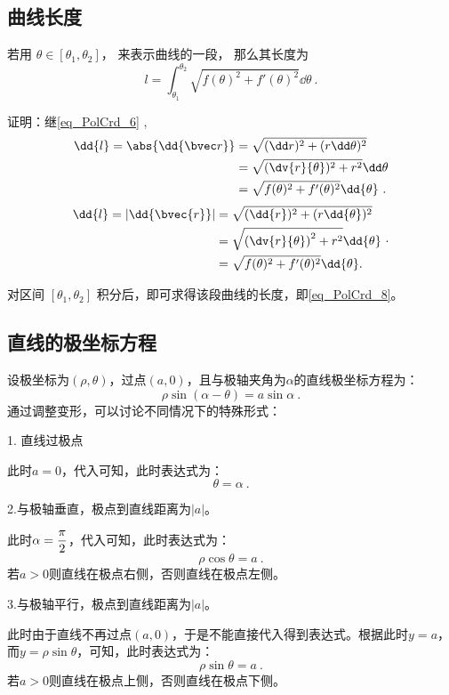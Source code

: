 \subsection{曲线长度}

若用 $\theta \in [\theta_1, \theta_2]$， 来表示曲线的一段， 那么其长度为
\begin{equation}\label{eq_PolCrd_8}
l = \int_{\theta_1}^{\theta_2} \sqrt{f(\theta)^2 + f'(\theta)^2} \dd{\theta}~.
\end{equation}

证明：继\autoref{eq_PolCrd_6} ,
\begin{align}
\dd{l} = \abs{\dd{\bvec r}} &=\sqrt{(\dd r)^2 + (r \dd \theta)^2} \\
&=\sqrt{(\dv {r}{\theta} )^2 + r^2} \dd \theta \\
&=\sqrt{f(\theta)^2 + f'(\theta)^2} \dd{\theta}~.
\end{align}
\begin{equation}
\begin{split}
\dd{l} = |\dd{\bvec{r}}| &= \sqrt{(\dd{r})^2 + (r \dd{\theta})^2} \\
&= \sqrt{\left(\dv{r}{\theta}\right)^2 + r^2} \dd{\theta} \\
&= \sqrt{f(\theta)^2 + f'(\theta)^2} \dd{\theta}.
\end{split}~.
\end{equation}

对区间 $[\theta_1,\theta_2]$ 积分后，即可求得该段曲线的长度，即\autoref{eq_PolCrd_8}。

\subsection{直线的极坐标方程}

设极坐标为$(\rho,\theta)$，过点$(a,0)$，且与极轴夹角为$\alpha$的直线极坐标方程为：
\begin{equation}
\rho\sin(\alpha-\theta)=a\sin\alpha~.
\end{equation}
通过调整变形，可以讨论不同情况下的特殊形式：

1. 直线过极点

此时$a=0$，代入可知，此时表达式为：
\begin{equation}
\theta=\alpha~.
\end{equation}

2.与极轴垂直，极点到直线距离为$|a|$。

此时$\displaystyle\alpha={\pi\over2}$，代入可知，此时表达式为：
\begin{equation}
\rho\cos\theta=a~.
\end{equation}
若$a>0$则直线在极点右侧，否则直线在极点左侧。

3.与极轴平行，极点到直线距离为$|a|$。

此时由于直线不再过点$(a,0)$，于是不能直接代入得到表达式。根据此时$y=a$，而$y=\rho\sin\theta$，可知，此时表达式为：
\begin{equation}
\rho\sin\theta=a~.
\end{equation}
若$a>0$则直线在极点上侧，否则直线在极点下侧。




